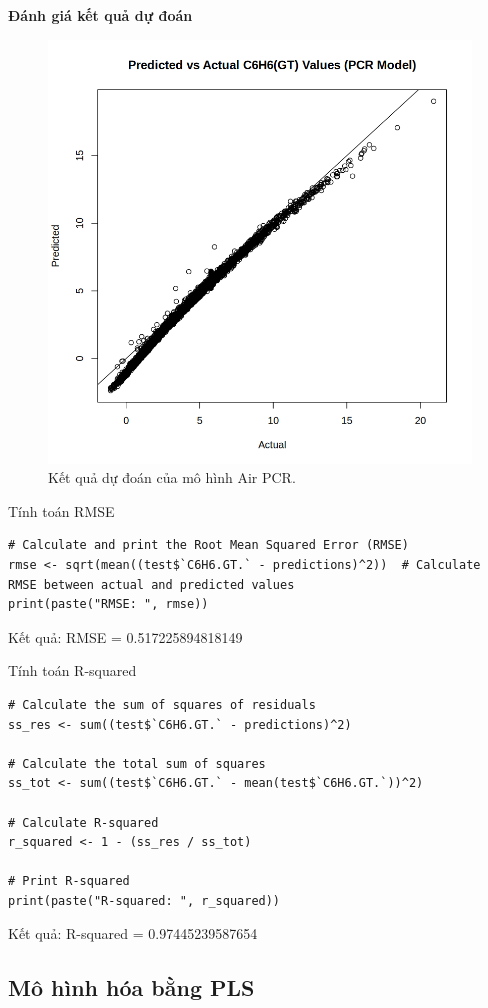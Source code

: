 \textbf{Đánh giá kết quả dự đoán}
\begin{figure}[H]
    \centering
    \includegraphics[width=0.75\columnwidth]{air_figures/pcr_prediction.png}
    \caption{Kết quả dự đoán của mô hình Air PCR.}
    \label{fig:air_pcr_prediction}
\end{figure}

Tính toán RMSE
\begin{lstlisting}
# Calculate and print the Root Mean Squared Error (RMSE)
rmse <- sqrt(mean((test$`C6H6.GT.` - predictions)^2))  # Calculate RMSE between actual and predicted values
print(paste("RMSE: ", rmse)) 
\end{lstlisting}
Kết quả: RMSE = 0.517225894818149

Tính toán R-squared
\begin{lstlisting}
# Calculate the sum of squares of residuals
ss_res <- sum((test$`C6H6.GT.` - predictions)^2)

# Calculate the total sum of squares
ss_tot <- sum((test$`C6H6.GT.` - mean(test$`C6H6.GT.`))^2)

# Calculate R-squared
r_squared <- 1 - (ss_res / ss_tot)

# Print R-squared
print(paste("R-squared: ", r_squared))
\end{lstlisting}

Kết quả: R-squared = 0.97445239587654

\subsection{Mô hình hóa bằng PLS}

